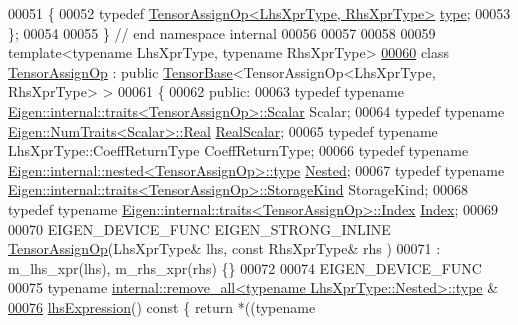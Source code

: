 \begin{DoxyCode}
00051 \{
00052   \textcolor{keyword}{typedef} \hyperlink{class_eigen_1_1_tensor_assign_op}{TensorAssignOp<LhsXprType, RhsXprType>} 
      \hyperlink{class_eigen_1_1_tensor_assign_op}{type};
00053 \};
00054 
00055 \}  \textcolor{comment}{// end namespace internal}
00056 
00057 
00058 
00059 \textcolor{keyword}{template}<\textcolor{keyword}{typename} LhsXprType, \textcolor{keyword}{typename} RhsXprType>
\hyperlink{class_eigen_1_1_tensor_assign_op}{00060} \textcolor{keyword}{class }\hyperlink{class_eigen_1_1_tensor_assign_op}{TensorAssignOp} : \textcolor{keyword}{public} \hyperlink{class_eigen_1_1_tensor_base}{TensorBase}<TensorAssignOp<LhsXprType, RhsXprType> >
00061 \{
00062   \textcolor{keyword}{public}:
00063   \textcolor{keyword}{typedef} \textcolor{keyword}{typename} \hyperlink{struct_eigen_1_1internal_1_1traits}{Eigen::internal::traits<TensorAssignOp>::Scalar}
       Scalar;
00064   \textcolor{keyword}{typedef} \textcolor{keyword}{typename} \hyperlink{group___sparse_core___module}{Eigen::NumTraits<Scalar>::Real} 
      \hyperlink{group___sparse_core___module}{RealScalar};
00065   \textcolor{keyword}{typedef} \textcolor{keyword}{typename} LhsXprType::CoeffReturnType CoeffReturnType;
00066   \textcolor{keyword}{typedef} \textcolor{keyword}{typename} \hyperlink{class_eigen_1_1internal_1_1_tensor_lazy_evaluator_writable}{Eigen::internal::nested<TensorAssignOp>::type}
       \hyperlink{class_eigen_1_1internal_1_1_tensor_lazy_evaluator_writable}{Nested};
00067   \textcolor{keyword}{typedef} \textcolor{keyword}{typename} \hyperlink{struct_eigen_1_1internal_1_1traits}{Eigen::internal::traits<TensorAssignOp>::StorageKind}
       StorageKind;
00068   \textcolor{keyword}{typedef} \textcolor{keyword}{typename} \hyperlink{struct_eigen_1_1internal_1_1traits}{Eigen::internal::traits<TensorAssignOp>::Index}
       \hyperlink{namespace_eigen_a62e77e0933482dafde8fe197d9a2cfde}{Index};
00069 
00070   EIGEN\_DEVICE\_FUNC EIGEN\_STRONG\_INLINE \hyperlink{class_eigen_1_1_tensor_assign_op}{TensorAssignOp}(LhsXprType& lhs, \textcolor{keyword}{const} RhsXprType& rhs
      )
00071       : m\_lhs\_xpr(lhs), m\_rhs\_xpr(rhs) \{\}
00072 
00074     EIGEN\_DEVICE\_FUNC
00075     \textcolor{keyword}{typename} \hyperlink{group___sparse_core___module}{internal::remove\_all<typename LhsXprType::Nested>::type}
      &
\hyperlink{class_eigen_1_1_tensor_assign_op_a1a6f7336727e3f95616014883d514caa}{00076}     \hyperlink{class_eigen_1_1_tensor_assign_op_a1a6f7336727e3f95616014883d514caa}{lhsExpression}()\textcolor{keyword}{ const }\{ \textcolor{keywordflow}{return} *((\textcolor{keyword}{typename} 

\end{DoxyCode}
